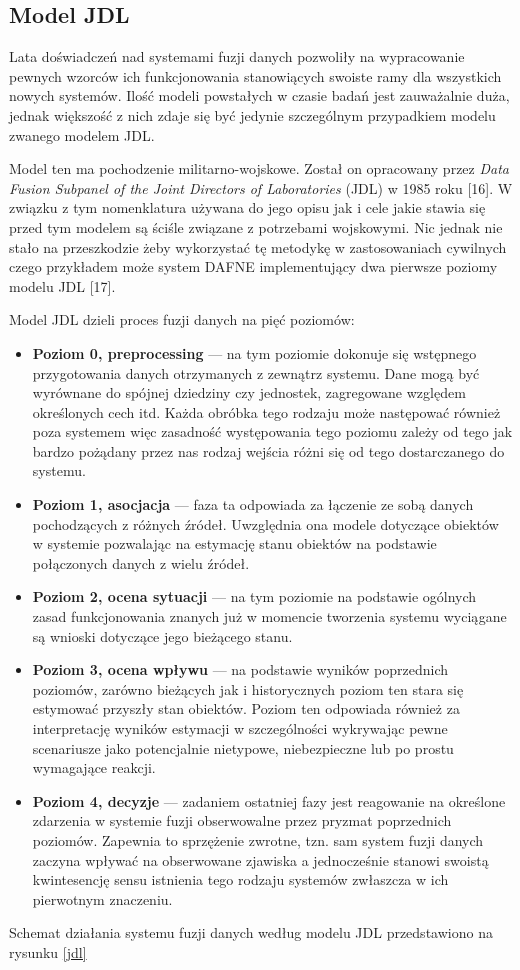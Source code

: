 \subsection{Model JDL}
\par{
Lata doświadczeń nad systemami fuzji danych pozwoliły na wypracowanie pewnych wzorców ich funkcjonowania stanowiących swoiste ramy dla wszystkich nowych systemów. Ilość modeli powstałych w czasie badań jest zauważalnie duża, jednak większość z nich zdaje się być jedynie szczególnym przypadkiem modelu zwanego modelem JDL.
}
\par{
Model ten ma pochodzenie militarno-wojskowe. Został on opracowany przez \textit{Data Fusion Subpanel of the Joint Directors of Laboratories} (JDL) w 1985 roku [16]. W związku z tym nomenklatura używana do jego opisu jak i cele jakie stawia się przed tym modelem są ściśle związane z potrzebami wojskowymi. Nic jednak nie stało na przeszkodzie żeby wykorzystać tę metodykę w zastosowaniach cywilnych czego przykładem może system DAFNE implementujący dwa pierwsze poziomy modelu JDL [17].
}
\par{
Model JDL dzieli proces fuzji danych na pięć poziomów:
\begin{itemize}
\renewcommand{\labelitemi}{}
\item \textbf{Poziom 0, preprocessing} --- na tym poziomie dokonuje się wstępnego przygotowania danych otrzymanych z zewnątrz systemu. Dane mogą być wyrównane do spójnej dziedziny czy jednostek, zagregowane względem określonych cech itd. Każda obróbka tego rodzaju może następować również poza systemem więc zasadność występowania tego poziomu zależy od tego jak bardzo pożądany przez nas rodzaj wejścia różni się od tego dostarczanego do systemu.
\item \textbf{Poziom 1, asocjacja} --- faza ta odpowiada za łączenie ze sobą danych pochodzących z różnych źródeł. Uwzględnia ona modele dotyczące obiektów w systemie pozwalając na estymację stanu obiektów na podstawie połączonych danych z wielu źródeł.
\item \textbf{Poziom 2, ocena sytuacji} --- na tym poziomie na podstawie ogólnych zasad funkcjonowania znanych już w momencie tworzenia systemu wyciągane są wnioski dotyczące jego bieżącego stanu.
\item \textbf{Poziom 3, ocena wpływu} --- na podstawie wyników poprzednich poziomów, zarówno bieżących jak i historycznych poziom ten stara się estymować przyszły stan obiektów. Poziom ten odpowiada również za interpretację wyników estymacji w szczególności wykrywając pewne scenariusze jako potencjalnie nietypowe, niebezpieczne lub po prostu wymagające reakcji.
\item \textbf{Poziom 4, decyzje} --- zadaniem ostatniej fazy jest reagowanie na określone zdarzenia w systemie fuzji obserwowalne przez pryzmat poprzednich poziomów. Zapewnia to sprzężenie zwrotne, tzn. sam system fuzji danych zaczyna wpływać na obserwowane zjawiska a jednocześnie stanowi swoistą kwintesencję sensu istnienia tego rodzaju systemów zwłaszcza w ich pierwotnym znaczeniu.
\end{itemize}
Schemat działania systemu fuzji danych według modelu JDL przedstawiono na rysunku \ref{jdl}
}

